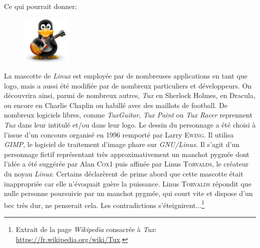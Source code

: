Ce qui pourrait donner:
\medskip

\begin{figure}
\includegraphics[width=2.3cm]{IMG/tux.png}
\end{figure}
La mascotte de \textit{Linux} est employée par de nombreuses applications en tant que logo, mais a aussi été modifiée par de nombreux particuliers et développeurs. On découvrira ainsi, parmi de nombreux autres, \textit{Tux} en Sherlock Holmes, en Dracula, ou encore en Charlie Chaplin ou habillé avec des maillots de football. De nombreux logiciels libres, comme \textit{TuxGuitar}, \textit{Tux Paint} ou \textit{Tux Racer} reprennent \textit{Tux} dans leur intitulé et/ou dans leur logo. Le dessin du personnage a été choisi à l'issue d'un concours organisé en 1996 remporté par Larry \textsc{Ewing}. Il utilisa \textit{GIMP}, le logiciel de traitement d'image phare sur \textit{GNU/Linux}. Il s'agit d'un personnage fictif représentant très approximativement un manchot pygmée dont l'idée a été suggérée par Alan \textsc{Cox1} puis affinée par Linus \textsc{Torvalds}, le créateur du noyau \textit{Linux}. Certains déclarèrent de prime abord que cette mascotte était inappropriée car elle n'évoquait guère la puissance. Linus \textsc{Torvalds} répondit que nulle personne poursuivie par un manchot pygmée, qui court vite et dispose d'un bec très dur, ne penserait cela. Les contradictions s'éteignirent...\footnote{Extrait de la page \textit{Wikipedia} consacrée à \textit{Tux}: \url{https://fr.wikipedia.org/wiki/Tux}.}
\medskip
